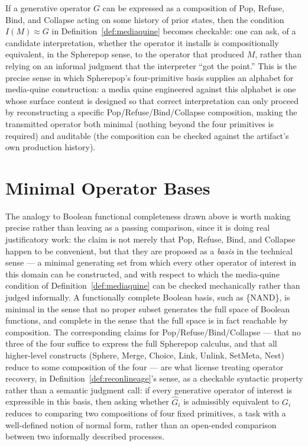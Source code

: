 \documentclass[11pt]{book}
\begin{document}
If a generative operator $G$ can be expressed as a composition of Pop, Refuse, Bind, and Collapse acting on some history of prior states, then the condition $I(M) \approx G$ in Definition~\ref{def:mediaquine} becomes checkable: one can ask, of a candidate interpretation, whether the operator it installs is compositionally equivalent, in the Spherepop sense, to the operator that produced $M$, rather than relying on an informal judgment that the interpreter ``got the point.'' This is the precise sense in which Spherepop's four-primitive basis supplies an alphabet for media-quine construction: a media quine engineered against this alphabet is one whose surface content is designed so that correct interpretation can only proceed by reconstructing a specific Pop/Refuse/Bind/Collapse composition, making the transmitted operator both minimal (nothing beyond the four primitives is required) and auditable (the composition can be checked against the artifact's own production history).

\section{Minimal Operator Bases}

The analogy to Boolean functional completeness drawn above is worth making precise rather than leaving as a passing comparison, since it is doing real justificatory work: the claim is not merely that Pop, Refuse, Bind, and Collapse happen to be convenient, but that they are proposed as a \emph{basis} in the technical sense --- a minimal generating set from which every other operator of interest in this domain can be constructed, and with respect to which the media-quine condition of Definition~\ref{def:mediaquine} can be checked mechanically rather than judged informally. A functionally complete Boolean basis, such as \{NAND\}, is minimal in the sense that no proper subset generates the full space of Boolean functions, and complete in the sense that the full space is in fact reachable by composition. The corresponding claims for Pop/Refuse/Bind/Collapse --- that no three of the four suffice to express the full Spherepop calculus, and that all higher-level constructs (Sphere, Merge, Choice, Link, Unlink, SetMeta, Nest) reduce to some composition of the four --- are what license treating operator recovery, in Definition~\ref{def:reconlineage}'s sense, as a checkable syntactic property rather than a semantic judgment call: if every generative operator of interest is expressible in this basis, then asking whether $\widehat{G}_i$ is admissibly equivalent to $G_i$ reduces to comparing two compositions of four fixed primitives, a task with a well-defined notion of normal form, rather than an open-ended comparison between two informally described processes.
\end{document}

